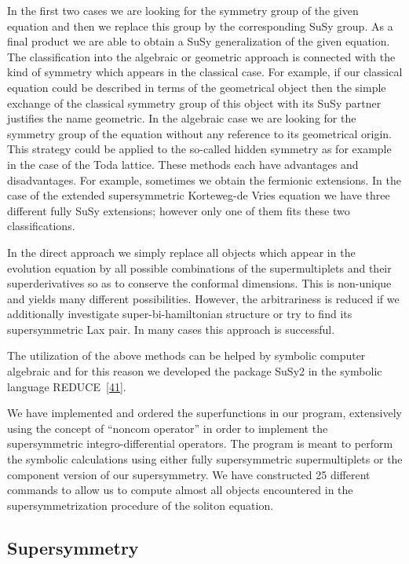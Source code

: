 {In the first two cases we are looking for the symmetry group of the
given equation and then we replace this group by the corresponding
SuSy group.  As a final product we are able to obtain a SuSy
generalization of the given equation.  The classification into the
algebraic or geometric approach is connected with the kind of symmetry
which appears in the classical case.  For example, if our classical
equation could be described in terms of the geometrical object then
the simple exchange of the classical symmetry group of this object
with its SuSy partner justifies the name geometric.  In the algebraic
case we are looking for the symmetry group of the equation without any
reference to its geometrical origin.  This strategy could be applied
to the so-called hidden symmetry as for example in the case of the
Toda lattice.  These methods each have advantages and disadvantages.
For example, sometimes we obtain the fermionic extensions.  In the
case of the extended supersymmetric Korteweg-de Vries equation we have
three different fully SuSy extensions; however only one of them fits
these two classifications.

In the direct approach we simply replace all objects which appear in
the evolution equation by all possible combinations of the
supermultiplets and their superderivatives so as to conserve the
conformal dimensions.  This is non-unique and yields many different
possibilities.  However, the arbitrariness is reduced if we
additionally investigate super-bi-hamiltonian structure or try to find
its supersymmetric Lax pair.  In many cases this approach is
successful.

The utilization of the above methods can be helped by symbolic
computer algebraic and for this reason we developed the package SuSy2
in the symbolic language REDUCE~\hyperref[susy2-bib]{[41]}.

We have implemented and ordered the superfunctions in our program,
extensively using the concept of ``noncom operator'' in order to
implement the supersymmetric integro-differential operators.  The
program is meant to perform the symbolic calculations using either
fully supersymmetric supermultiplets or the component version of our
supersymmetry.  We have constructed 25 different commands to allow us
to compute almost all objects encountered in the supersymmetrization
procedure of the soliton equation.

\subsection{Supersymmetry}

}
